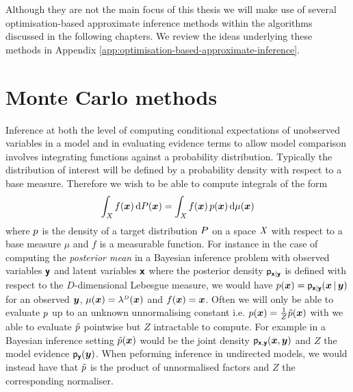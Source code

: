 Although they are not the main focus of this thesis we will make use of several optimisation-based approximate inference methods within the algorithms discussed in the following chapters. We review the ideas underlying these methods in Appendix \ref{app:optimisation-based-approximate-inference}. 

\section{Monte Carlo methods}

Inference at both the level of computing conditional expectations of unobserved variables in a model and in evaluating evidence terms to allow model comparison involves integrating functions against a probability distribution. Typically the distribution of interest will be defined by a probability density with respect to a base measure. Therefore we wish to be able to compute integrals of the form
\begin{equation}\label{eq:integral-against-density}
  \int_{\mathit{X}} f(\boldsymbol{x}) \, \mathrm{d} P(\boldsymbol{x}) =
  \int_{\mathit{X}} f(\boldsymbol{x}) \, p(\boldsymbol{x}) \,\mathrm{d}\mu(\boldsymbol{x})
\end{equation}
where $p$ is the density of a target distribution $P$ on a space $\mathit{X}$ with respect to a base measure $\mu$ and $f$ is a measurable function. For instance in the case of computing the \emph{posterior mean} in a Bayesian inference problem with observed variables $\boldsymbol{\mathsf{y}}$ and latent variables $\boldsymbol{\mathsf{x}}$ where the posterior density $\mathsf{p}_{\boldsymbol{\mathsf{x}}|\boldsymbol{\mathsf{y}}}$ is defined with respect to the $D$-dimensional Lebesgue measure, we would have  $p(\boldsymbol{x}) = \mathsf{p}_{\boldsymbol{\mathsf{x}}|\boldsymbol{\mathsf{y}}}(\boldsymbol{x}\operatorname{|}\boldsymbol{y})$ for an observed $\boldsymbol{y}$, $\mu(\vct{x}) = \lebm{D}(\vct{x})$ and $f(\boldsymbol{x}) = \boldsymbol{x}$. Often we will only be able to evaluate $p$ up to an unknown unnormalising constant i.e. $p(\boldsymbol{x}) = \frac{1}{Z}\tilde{p}(\boldsymbol{x})$ with we able to evaluate $\tilde{p}$ pointwise but $Z$ intractable to compute. For example in a Bayesian inference setting $\tilde{p}(\boldsymbol{x})$ would be the joint density $\mathsf{p}_{\boldsymbol{\mathsf{x}},\boldsymbol{\mathsf{y}}}(\boldsymbol{x},\boldsymbol{y})$ and $Z$ the model evidence $\mathsf{p}_{\boldsymbol{\mathsf{y}}}(\boldsymbol{y})$. When peforming inference in undirected models, we would instead have that $\tilde{p}$ is the product of unnormalised factors and $Z$ the corresponding normaliser.


